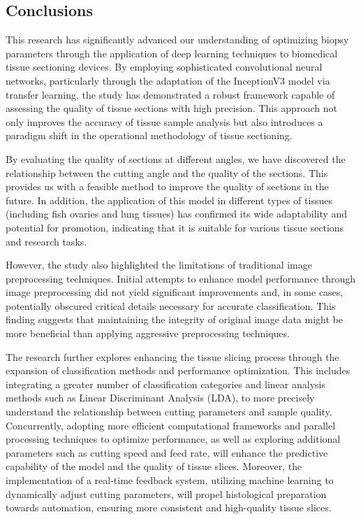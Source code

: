 \subsection{Conclusions}

This research has significantly advanced our understanding of optimizing biopsy parameters through the application of deep learning techniques to biomedical tissue sectioning devices. By employing sophisticated convolutional neural networks, particularly through the adaptation of the InceptionV3 model via transfer learning, the study has demonstrated a robust framework capable of assessing the quality of tissue sections with high precision. This approach not only improves the accuracy of tissue sample analysis but also introduces a paradigm shift in the operational methodology of tissue sectioning.

By evaluating the quality of sections at different angles, we have discovered the relationship between the cutting angle and the quality of the sections. This provides us with a feasible method to improve the quality of sections in the future. In addition, the application of this model in different types of tissues (including fish ovaries and lung tissues) has confirmed its wide adaptability and potential for promotion, indicating that it is suitable for various tissue sections and research tasks.

However, the study also highlighted the limitations of traditional image preprocessing techniques. Initial attempts to enhance model performance through image preprocessing did not yield significant improvements and, in some cases, potentially obscured critical details necessary for accurate classification. This finding suggests that maintaining the integrity of original image data might be more beneficial than applying aggressive preprocessing techniques.

The research further explores enhancing the tissue slicing process through the expansion of classification methods and performance optimization. This includes integrating a greater number of classification categories and linear analysis methods such as Linear Discriminant Analysis (LDA), to more precisely understand the relationship between cutting parameters and sample quality. Concurrently, adopting more efficient computational frameworks and parallel processing techniques to optimize performance, as well as exploring additional parameters such as cutting speed and feed rate, will enhance the predictive capability of the model and the quality of tissue slices. Moreover, the implementation of a real-time feedback system, utilizing machine learning to dynamically adjust cutting parameters, will propel histological preparation towards automation, ensuring more consistent and high-quality tissue slices.


